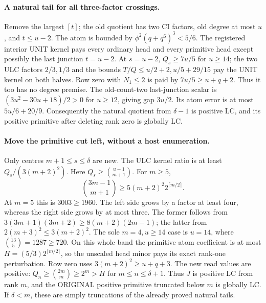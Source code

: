 \paragraph{A natural tail for all three-factor crossings.}
Remove the largest $[t]$; the old quotient has two CI factors,
old degree at most $u$, and $t\le u-2$.
The atom is bounded by $\phi^2(q+q^6)^3<5/6$.
The registered interior UNIT kernel pays every ordinary head and
every primitive head except possibly the last junction $t=u-2$.
At $s=u-2$, $Q_s\ge7u/5$ for $u\ge14$; the two ULC factors
$2/3,1/3$ and the bounds $T/Q\le u/2+2,u/5+29/15$ pay
the UNIT kernel on both halves. Row zero with $N_1\le2$ is paid by
$7u/5\ge u+q+2$. Thus it too has no degree premise.
The old-count-two last-junction scalar is
$(3u^2-30u+18)/2>0$ for $u\ge12$, giving gap $3u/2$.
Its atom error is at most $5u/6+20/9$.
Consequently the natural quotient from $\delta-1$ is positive LC,
and its positive primitive after deleting rank zero is globally LC.

\paragraph{Move the primitive cut left, without a host enumeration.}
Only centres $m+1\le s\le\delta$ are new. The ULC kernel ratio is
at least $Q_s/(3(m+2)^2)$. Here
$Q_s\ge\binom{u-1}{m+1}$.
For $m\ge5$,
\[
 \binom{3m-1}{m+1}\ge5(m+2)^2 2^{\lceil m/2\rceil}.
\]
At $m=5$ this is $3003\ge1960$. The left side grows by a
factor at least four, whereas the right side grows by at most three.
The former follows from
$3(3m+1)(3m+2)\ge8(m+2)(2m-1)$;
the latter from $2(m+3)^2\le3(m+2)^2$.
The sole $m=4,u\ge14$ case is $u=14$, where
$\binom{13}{5}=1287\ge720$.
On this whole band the primitive atom coefficient is at most
$H=(5/3)2^{\lceil m/2\rceil}$, so the unscaled head minor
pays its exact rank-one perturbation.
Row zero uses $3(m+2)^2\ge u+q+3$.
The new read values are positive: $Q_n\ge\binom{2m}{m}\ge2^m>H$
for $m\le n\le\delta+1$.
Thus $J$ is positive LC from rank $m$, and the ORIGINAL positive
primitive truncated below $m$ is globally LC. If $\delta<m$, these
are simply truncations of the already proved natural tails.

